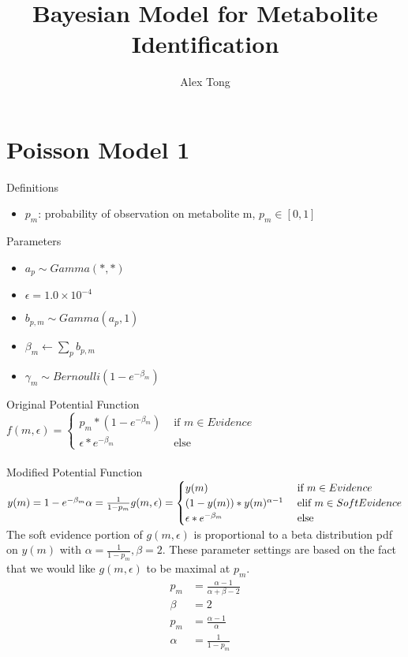 \documentclass[11pt]{article}
\title{Bayesian Model for Metabolite Identification}
\author{Alex Tong}
\begin{document}
\maketitle

\section {Poisson Model 1}
Definitions
\begin{itemize}
    \item $p_m$: probability of observation on metabolite m, $p_m \in [0,1]$
\end{itemize}
Parameters
\begin{itemize}
    \item $a_p \sim Gamma(*,*)$
    \item $\epsilon = 1.0\times10^{-4}$
    \item $b_{p,m} \sim Gamma(a_p, 1)$
    \item $\beta_m \leftarrow \sum_p b_{p,m}$
    \item $\gamma_m \sim Bernoulli(1 - e^{-\beta_m})$
\end{itemize}
Original Potential Function\\
$f(m,\epsilon) = \begin{cases}
 p_m * (1-e^{-\beta_m}) & \text{ if } m \in Evidence \\ 
 \epsilon * e ^ {-\beta_m}& \text{ else}
\end{cases}$
\\\\
Modified Potential Function \\
$y(m) = 1 - e^{-\beta_m} \\
\alpha = \frac{1}{1 - p_m}\\
g(m,\epsilon) = \begin{cases}
 y(m) & \text{ if } m \in Evidence \\ 
 (1 - y(m)) * y(m) ^ {\alpha - 1} &\text{ elif } m \in SoftEvidence\\
 \epsilon * e ^ {-\beta_m}& \text{ else}
\end{cases}$\\
The soft evidence portion of $g(m, \epsilon)$ is proportional to a beta distribution pdf on $y(m)$ with $\alpha = \frac{1}{1 - p_m}, \beta = 2$. These parameter settings are based on the fact that we would like $g(m, \epsilon)$ to be maximal at $p_m$. \\
$$\begin{align*}
p_m &= \frac{\alpha - 1}{\alpha + \beta - 2} \\ 
\beta &= 2 \\ 
p_m &= \frac{\alpha - 1}{\alpha} \\
\alpha &=  \frac{1}{1 - p_m}
\end{align*}$$
\end{document}
